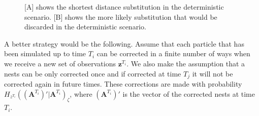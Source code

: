 \documentclass[11pt,a4paper]{article}
\renewcommand{\vec}[1]{\mathbf{#1}}
\begin{document}
\begin{figure}
\centering
\caption{[A] shows the shortest distance substitution in the deterministic scenario. [B] shows the more likely substitution that would be discarded in the deterministic scenario.}
\label{fig:1}
\end{figure}

A better strategy would be the following. Assume that each particle that has been simulated up to time $T_i$ can be corrected in a finite number of ways when we receive a new set of observations $\vec{z}^{T_i}$. We also make the assumption that a nests can be only corrected once and if corrected at time $T_j$ it will not be corrected again in future times. These corrections are made with probability $H_{z^{T_i}}((\vec{A}^{T_i})' | \vec{A}^{T_i})_{\zeta}$, where $(\vec{A}^{T_i})'$ is the vector of the corrected nests at time $T_i$.
\end{document}
